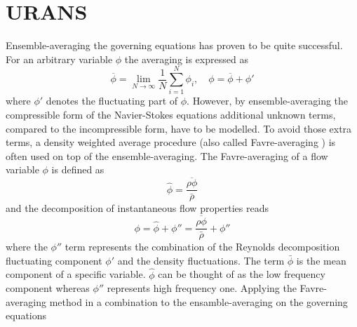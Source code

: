 
\section{URANS}
Ensemble-averaging the governing equations has proven to be quite successful. For an arbitrary variable $\phi$ the averaging is expressed as
\begin{equation}
  \overline{\phi} = \lim\limits_{N \to \infty}\frac{1}{N}\sum ^{N} _{i=1} \phi_i,  \quad \phi = \overline{\phi}+\phi'
\end{equation}
where $\phi'$ denotes the fluctuating part of $\phi$. However, by ensemble-averaging the compressible form of the Navier-Stokes equations additional unknown terms, compared to the incompressible form, have to be modelled. To avoid those extra terms, a density weighted average procedure (also called Favre-averaging \cite{Favre1969}) is often used on top of the ensemble-averaging. The Favre-averaging of a flow variable ${\phi}$ is defined as 
\begin{equation}
  \hat{\phi} = \frac{\overline{\rho \phi}}{\bar{\rho}}
\end{equation}
and the decomposition of instantaneous flow properties reads
\begin{equation}
  \phi = \hat{\phi}+\phi'' = \frac{\overline{\rho \phi}}{\bar{\rho}}+\phi''
\end{equation}
where the $\phi''$ term represents the combination of the Reynolds decomposition fluctuating component $\phi'$ and the density fluctuations. The term $\bar{\phi}$ is the mean component of a specific variable. $\hat{\phi}$ can be thought of as the low frequency component whereas $\phi''$ represents high frequency one.
Applying the Favre-averaging method in a combination to the ensamble-averaging on the governing equations
